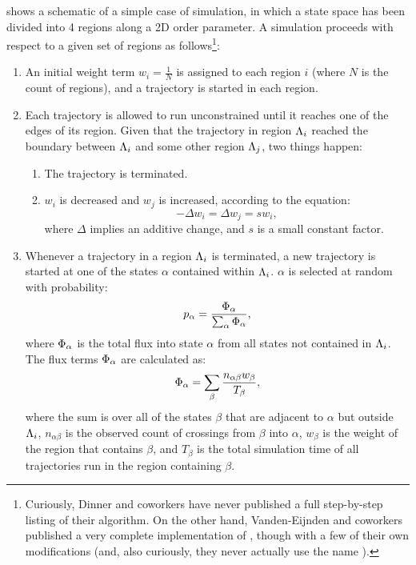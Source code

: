  shows a schematic of a simple case of  simulation, in which a state space has been divided into 4 regions along a 2D order parameter. A  simulation proceeds with respect to a given set of regions as follows\footnote{Curiously, Dinner and coworkers have never published a full step-by-step listing of their  algorithm. On the other hand, Vanden-Eijnden and coworkers published a very complete implementation of \supercite{VandenEijnden:2009jh}, though with a few of their own modifications (and, also curiously, they never actually use the name ).}:
\begin{enumerate}
    \item An initial weight term $w_i = \frac{1}{N}$ is assigned to each region $i$ (where $N$ is the count of regions), and a trajectory is started in each region.
    \item Each trajectory is allowed to run unconstrained until it reaches one of the edges of its region. Given that the trajectory in region $\Lambda_{i}$ reached the boundary between $\Lambda_{i}$ and some other region $\Lambda_{j}$, two things happen:
    \begin{enumerate}
        \item The trajectory is terminated.%
        \item $w_i$ is decreased and $w_j$ is increased, according to the equation:
        \begin{equation*}
            -\Delta w_i = \Delta w_j = s w_i,
        \end{equation*}
        where $\Delta$ implies an additive change, and $s$ is a small constant factor.
    \end{enumerate}
    \item Whenever a trajectory in a region $\Lambda_{i}$ is terminated, a new trajectory is started at one of the states $\alpha$ contained within $\Lambda_{i}$. $\alpha$ is selected at random with probability:
    \begin{equation*}
        p_{\alpha} = \frac{\Phi_{\alpha}}{\sum_{\alpha} \Phi_{\alpha}},
    \end{equation*}
    where $\Phi_{\alpha}$ is the total flux into state $\alpha$ from all states not contained in $\Lambda_{i}$. The flux terms $\Phi_{\alpha}$ are calculated as:
    \begin{equation*}
        \Phi_{\alpha} = \sum_{\beta} \frac{n_{\alpha \beta} w_{\beta}}{T_{\beta}},
    \end{equation*}
    where the sum is over all of the states $\beta$ that are adjacent to $\alpha$ but outside $\Lambda_{i}$, $n_{\alpha \beta}$ is the observed count of crossings from $\beta$ into $\alpha$, $w_{\beta}$ is the weight of the region that contains $\beta$, and $T_{\beta}$ is the total simulation time of all trajectories run in the region containing $\beta$.
\end{enumerate}

